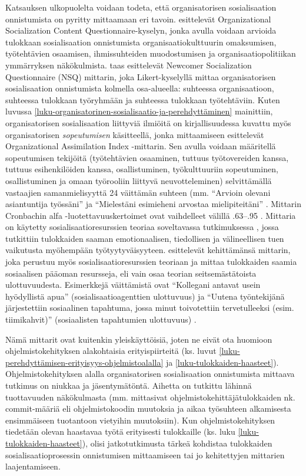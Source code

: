 \documentclass[utf8]{gradu3}
\begin{document}
Katsauksen ulkopuolelta voidaan todeta, että organisatorisen sosialisaation onnistumista on pyritty mittaamaan eri tavoin. \textcite{zhao-ym-2007-mittari} esittelevät Organizational Socialization Content Questionnaire-kyselyn, jonka avulla voidaan arvioida tulokkaan sosialisaation onnistumista organisaatiokulttuurin omaksumisen, työtehtävien osaamisen, ihmissuhteiden muodostumisen ja organisaatiopolitiikan ymmärryksen näkökulmista. \textcite{haueter-ym-2003} taas esittelevät Newcomer Socialization Questionnaire (NSQ) mittarin, joka Likert-kyselyllä mittaa organisatorisen sosialisaation onnistumista kolmella osa-alueella: suhteessa organisaatioon, suhteessa tulokkaan työryhmään ja suhteessa tulokkaan työtehtäviin. Kuten luvussa \ref{luku-organisatorinen-sosialisaatio-ja-perehdyttäminen} mainittiin, organisatorisen sosialisaation liittyviä ilmiöitä on kirjallisuudessa kuvattu myös organisatorisen \textit{sopeutumisen} käsitteellä, jonka mittaamiseen \textcite{gailliard-ym-2010} esittelevät Organizational Assimilation Index -mittarin. Sen avulla voidaan määritellä sopeutumisen tekijöitä (työtehtävien osaaminen, tuttuus työtovereiden kanssa, tuttuus esihenkilöiden kanssa, osallistuminen, työkulttuuriin sopeutuminen, osallistuminen ja omaan työrooliin liittyvä neuvotteleminen) selvittämällä vastaajien samanmielisyyttä 24 väittämän suhteen (mm. ``Arvioin olevani asiantuntija työssäni” ja “Mielestäni esimieheni arvostaa mielipiteitäni'' \parencite{gailliard-ym-2010}. Mittarin Cronbachin alfa -luotettavuuskertoimet ovat vaihdelleet välillä .63--.95 \parencite{gailliard-ym-2010}. Mittaria on käytetty sosialisaatioresurssien teoriaa soveltavassa tutkimuksessa \parencite{cranmer-ym-2016}, jossa tutkittiin tulokkaiden saaman emotionaalisen, tiedollisen ja välineellisen tuen vaikutusta myöhempään työtyytyväisyyteen. \textcite{harris-ym-2022} esittelevät kehittämänsä mittarin, joka perustuu myös sosialisaatioresurssien teoriaan ja mittaa tulokkaiden saamia sosiaalisen pääoman resursseja, eli vain osaa teorian seitsemästätoista ulottuvuudesta. Esimerkkejä väittämistä ovat ``Kollegani antavat usein hyödyllistä apua'' (sosialisaatioagenttien ulottuvuus) ja  ``Uutena työntekijänä järjestettiin sosiaalinen tapahtuma, jossa minut toivotettiin tervetulleeksi (esim. tiimikahvit)'' (sosiaalisten tapahtumien ulottuvuus) \parencite{harris-ym-2022}.  

Nämä mittarit ovat kuitenkin yleiskäyttöisiä, joten ne eivät ota huomioon ohjelmistokehityksen alakohtaisia erityispiirteitä (ks. luvut \ref{luku-perehdyttämisen-erityisyys-ohjelmistoalalla} ja \ref{luku-tulokkaiden-haasteet}). Ohjelmistokehityksen alalla organisatorisen sosialisaation onnistumista mittaava tutkimus on niukkaa ja jäsentymätöntä. Aihetta on tutkittu lähinnä tuottavuuden näkökulmasta (mm. \textcite{rastogi-ym-2017} mittasivat ohjelmistokehittäjätulokkaiden nk. commit-määriä eli ohjelmistokoodin muutoksia ja aikaa työsuhteen alkamisesta ensimmäiseen tuotantoon vietyihin muutoksiin). Kun ohjelmistokehityksen tiedetään olevan haastavaa työtä erityisesti tulokkaille (ks. luku \ref{luku-tulokkaiden-haasteet}), olisi jatkotutkimusta tärkeä kohdistaa tulokkaiden sosialisaatioprosessin onnistumisen mittaamiseen tai jo kehitettyjen mittarien laajentamiseen.
\end{document}
